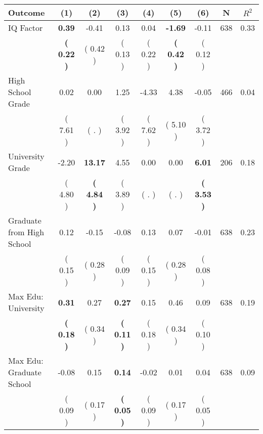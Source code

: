 \begin{tabular}{lcccccccc}
\toprule
 \textbf{Outcome} & \textbf{(1)} & \textbf{(2)} & \textbf{(3)} & \textbf{(4)} & \textbf{(5)} & \textbf{(6)} & \textbf{N} & \textbf{$ R^2$} \\
\midrule
IQ Factor & \textbf{     0.39} &     -0.41 &      0.13 &      0.04 & \textbf{    -1.69} &     -0.11 & 638 &       0.33 \\ 
 & \textbf{(     0.22 )} & (     0.42 ) & (     0.13 ) & (     0.22 ) & \textbf{(     0.42 )} & (     0.12 ) & \\
High School Grade &      0.02 &      0.00 &      1.25 &     -4.33 &      4.38 &     -0.05 & 466 &       0.04 \\ 
 & (     7.61 ) & (        . ) & (     3.92 ) & (     7.62 ) & (     5.10 ) & (     3.72 ) & \\
University Grade &     -2.20 & \textbf{    13.17} &      4.55 &      0.00 &      0.00 & \textbf{     6.01} & 206 &       0.18 \\ 
 & (     4.80 ) & \textbf{(     4.84 )} & (     3.89 ) & (        . ) & (        . ) & \textbf{(     3.53 )} & \\
Graduate from High School &      0.12 &     -0.15 &     -0.08 &      0.13 &      0.07 &     -0.01 & 638 &       0.23 \\ 
 & (     0.15 ) & (     0.28 ) & (     0.09 ) & (     0.15 ) & (     0.28 ) & (     0.08 ) & \\
Max Edu: University & \textbf{     0.31} &      0.27 & \textbf{     0.27} &      0.15 &      0.46 &      0.09 & 638 &       0.19 \\ 
 & \textbf{(     0.18 )} & (     0.34 ) & \textbf{(     0.11 )} & (     0.18 ) & (     0.34 ) & (     0.10 ) & \\
Max Edu: Graduate School &     -0.08 &      0.15 & \textbf{     0.14} &     -0.02 &      0.01 &      0.04 & 638 &       0.09 \\ 
 & (     0.09 ) & (     0.17 ) & \textbf{(     0.05 )} & (     0.09 ) & (     0.17 ) & (     0.05 ) & \\
\bottomrule
\end{tabular}
